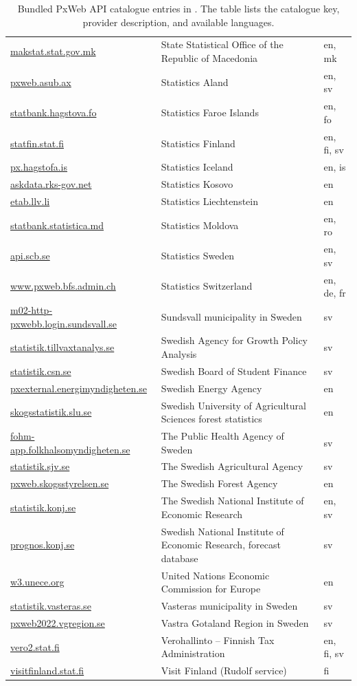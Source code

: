 \begin{table}[!htbp]
\begin{tabular}{@{}>{\raggedright\arraybackslash}p{}>{\raggedright\arraybackslash}p{}>{\raggedright\arraybackslash}p{}@{}}
\url{makstat.stat.gov.mk} & State Statistical Office of the Republic of Macedonia & en, mk\\
\url{pxweb.asub.ax} & Statistics Aland & en, sv\\
\url{statbank.hagstova.fo} & Statistics Faroe Islands & en, fo\\
\url{statfin.stat.fi} & Statistics Finland & en, fi, sv\\
\url{px.hagstofa.is} & Statistics Iceland & en, is\\
\url{askdata.rks-gov.net} & Statistics Kosovo & en\\
\url{etab.llv.li} & Statistics Liechtenstein & en\\
\url{statbank.statistica.md} & Statistics Moldova & en, ro\\
\url{api.scb.se} & Statistics Sweden & en, sv\\
\url{www.pxweb.bfs.admin.ch} & Statistics Switzerland & en, de, fr\\
\url{m02-http-pxwebb.login.sundsvall.se} & Sundsvall municipality in Sweden & sv\\
\url{statistik.tillvaxtanalys.se} & Swedish Agency for Growth Policy Analysis & sv\\
\url{statistik.csn.se} & Swedish Board of Student Finance & sv\\
\url{pxexternal.energimyndigheten.se} & Swedish Energy Agency & en\\
\url{skogsstatistik.slu.se} & Swedish University of Agricultural Sciences forest statistics & en\\
\url{fohm-app.folkhalsomyndigheten.se} & The Public Health Agency of Sweden & sv\\
\url{statistik.sjv.se} & The Swedish Agricultural Agency & sv\\
\url{pxweb.skogsstyrelsen.se} & The Swedish Forest Agency & en\\
\url{statistik.konj.se} & The Swedish National Institute of Economic Research & en, sv\\
\url{prognos.konj.se} & Swedish National Institute of Economic Research, forecast database & sv\\
\url{w3.unece.org} & United Nations Economic Commission for Europe & en\\
\url{statistik.vasteras.se} & Vasteras municipality in Sweden & sv\\
\url{pxweb2022.vgregion.se} & Vastra Gotaland Region in Sweden & sv\\
\url{vero2.stat.fi} & Verohallinto -- Finnish Tax Administration & en, fi, sv\\
\url{visitfinland.stat.fi} & Visit Finland (Rudolf service) & fi\\
\bottomrule
\end{tabular}
\caption{\label{tab:api-catalogue}Bundled PxWeb API catalogue entries in . The table lists the catalogue key, provider description, and available languages.}
\end{table}

